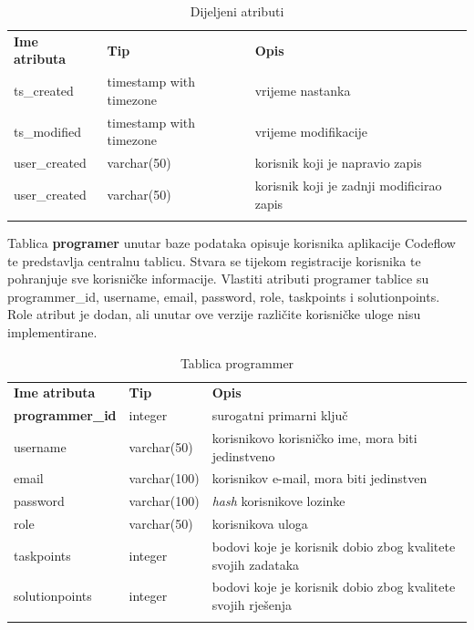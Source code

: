 \documentclass[times, utf8, zavrsni, numeric]{fer}
\begin{document}
		\begin{table}[H]
			\caption{Dijeljeni atributi}
			\label{tbl:dij-attr}
			\centering
			\begin{tabu} to \textwidth {XXX}
				\tabucline[1.75pt]{-}
				\textbf{Ime atributa} & \textbf{Tip} & \textbf{Opis}\\				
				\tabucline[1.75pt]{-}
				ts\_created & timestamp with timezone & vrijeme nastanka\\ \hline
				ts\_modified & timestamp with timezone & vrijeme modifikacije\\ \hline
				user\_created & varchar(50) & korisnik koji je napravio zapis\\ \hline
				user\_created & varchar(50) & korisnik koji je zadnji modificirao zapis\\
				\tabucline[1.75pt]{-}
			\end{tabu}
		\end{table}
		
		Tablica \textbf{programer} unutar baze podataka opisuje korisnika aplikacije Codeflow te predstavlja centralnu tablicu. Stvara se tijekom registracije korisnika te pohranjuje sve korisničke informacije. Vlastiti atributi programer tablice su programmer\_id, username, email, password, role, taskpoints i solutionpoints. Role atribut je dodan, ali unutar ove verzije različite korisničke uloge nisu implementirane.
		\begin{table}[H]
			\caption{Tablica programmer}
			\label{tbl:programmer}
			\centering
			\begin{tabu} to \textwidth {XXX}
				\tabucline[1.75pt]{-}
				\textbf{Ime atributa} & \textbf{Tip} & \textbf{Opis}\\ 				
				\tabucline[1.75pt]{-}
				\textbf{programmer\_id} & integer & surogatni primarni ključ\\ \hline
				username & varchar(50) & korisnikovo korisničko ime, mora biti jedinstveno\\ \hline
				email & varchar(100) & korisnikov e-mail, mora biti jedinstven\\ \hline
				password & varchar(100) & \textit{hash} korisnikove lozinke\\ \hline
				role & varchar(50) & korisnikova uloga\\ \hline
				taskpoints & integer & bodovi koje je korisnik dobio zbog kvalitete svojih zadataka\\ \hline
				solutionpoints & integer &  bodovi koje je korisnik dobio zbog kvalitete svojih rješenja\\
				\tabucline[1.75pt]{-}
			\end{tabu}
		\end{table}
		
\end{document}

